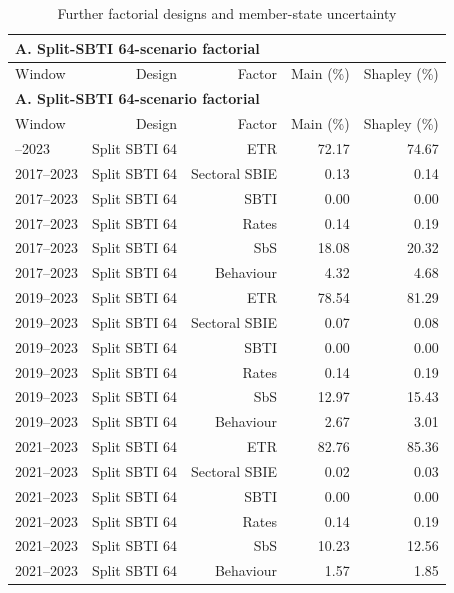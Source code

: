 {\small\setlength{\LTpre}{4pt}\setlength{\LTpost}{4pt}
\begin{longtable}{@{}lrrrr@{}}
\caption{Further factorial designs and member-state uncertainty}\label{tab:tab_v2_app_table5_country_uncertainty} \\
\multicolumn{5}{l}{\textbf{A. Split-SBTI 64-scenario factorial}} \\
\toprule
Window & Design & Factor & Main (\%) & Shapley (\%) \\
\midrule
\endfirsthead
\multicolumn{5}{l}{\textbf{A. Split-SBTI 64-scenario factorial}} \\
\toprule
Window & Design & Factor & Main (\%) & Shapley (\%) \\
\midrule
\endhead
\midrule
\endfoot
\bottomrule
\endlastfoot
2017–2023 & Split SBTI 64 & ETR & 72.17 & 74.67 \\
2017–2023 & Split SBTI 64 & Sectoral SBIE &  0.13 &  0.14 \\
2017–2023 & Split SBTI 64 & SBTI &  0.00 &  0.00 \\
2017–2023 & Split SBTI 64 & Rates &  0.14 &  0.19 \\
2017–2023 & Split SBTI 64 & SbS & 18.08 & 20.32 \\
2017–2023 & Split SBTI 64 & Behaviour &  4.32 &  4.68 \\
2019–2023 & Split SBTI 64 & ETR & 78.54 & 81.29 \\
2019–2023 & Split SBTI 64 & Sectoral SBIE &  0.07 &  0.08 \\
2019–2023 & Split SBTI 64 & SBTI &  0.00 &  0.00 \\
2019–2023 & Split SBTI 64 & Rates &  0.14 &  0.19 \\
2019–2023 & Split SBTI 64 & SbS & 12.97 & 15.43 \\
2019–2023 & Split SBTI 64 & Behaviour &  2.67 &  3.01 \\
2021–2023 & Split SBTI 64 & ETR & 82.76 & 85.36 \\
2021–2023 & Split SBTI 64 & Sectoral SBIE &  0.02 &  0.03 \\
2021–2023 & Split SBTI 64 & SBTI &  0.00 &  0.00 \\
2021–2023 & Split SBTI 64 & Rates &  0.14 &  0.19 \\
2021–2023 & Split SBTI 64 & SbS & 10.23 & 12.56 \\
2021–2023 & Split SBTI 64 & Behaviour &  1.57 &  1.85 \\
\end{longtable}
}
